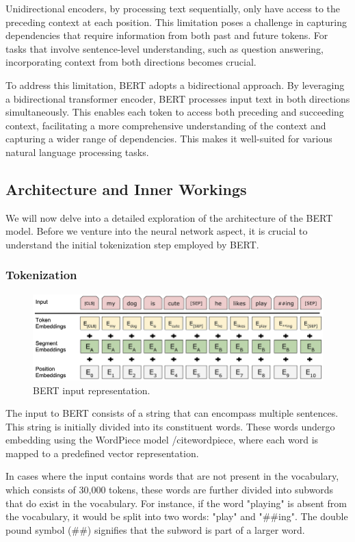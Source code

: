 \documentclass[a4paper,10pt]{report} %
\begin{document}
Unidirectional encoders, by processing text sequentially, only have access to the preceding context at each position. This limitation poses a challenge in capturing dependencies that require information from both past and future tokens. For tasks that involve sentence-level understanding, such as question answering, incorporating context from both directions becomes crucial.

To address this limitation, BERT adopts a bidirectional approach. By leveraging a bidirectional transformer encoder, BERT processes input text in both directions simultaneously. This enables each token to access both preceding and succeeding context, facilitating a more comprehensive understanding of the context and capturing a wider range of dependencies. This makes it well-suited for various natural language processing tasks.


\subsection{Architecture and Inner Workings}
We will now delve into a detailed exploration of the architecture of the BERT model. Before we venture into the neural network aspect, it is crucial to understand the initial tokenization step employed by BERT.

\subsubsection{Tokenization}
\begin{figure}
  \centering
  \includegraphics[width=12cm]{img/bert_input_representation.png}
  \caption{BERT input representation.}
  \label{fig:bert_architecture}
\end{figure}
The input to BERT consists of a string that can encompass multiple sentences. This string is initially divided into its constituent words. These words undergo embedding using the WordPiece model /cite{wordpiece}, where each word is mapped to a predefined vector representation.

In cases where the input contains words that are not present in the vocabulary, which consists of 30,000 tokens, these words are further divided into subwords that do exist in the vocabulary. For instance, if the word "playing" is absent from the vocabulary, it would be split into two words: "play" and "\#\#ing". The double pound symbol (\#\#) signifies that the subword is part of a larger word.
\end{document}
